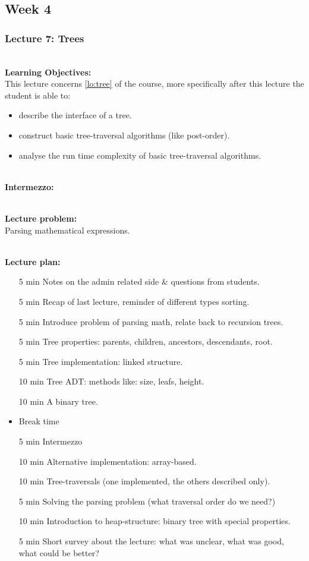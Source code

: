 \subsection{Week 4}
\label{sub:week_4}

\subsubsection{Lecture 7: Trees}
\label{sub:lecture_7}

\hfill\\
\textbf{Learning Objectives:}\\

This lecture concerns \cref{lo:tree} of the course, more specifically after this lecture the student is able
to:
\begin{itemize}
	\item describe the interface of a tree.
	\item construct basic tree-traversal algorithms (like post-order).
	\item analyse the run time complexity of basic tree-traversal algorithms.
\end{itemize}

\hfill\\
\textbf{Intermezzo:}\\

\hfill\\
\textbf{Lecture problem:}\\
Parsing mathematical expressions.

\hfill\\
\textbf{Lecture plan:}\\
\begin{itemize}
	\item[5 min] Notes on the admin related side \& questions from students.
	\item[5 min] Recap of last lecture, reminder of different types sorting.
	\item[5 min] Introduce problem of parsing math, relate back to recursion trees.
	\item[5 min] Tree properties: parents, children, ancestors, descendants, root.
	\item[5 min] Tree implementation: linked structure.
	\item[10 min] Tree ADT: methods like: size, leafs, height.
	\item[10 min] A binary tree.
	\item Break time
	\item[5 min] Intermezzo
	\item[10 min] Alternative implementation: array-based.
	\item[10 min] Tree-traversals (one implemented, the others described only).
	\item[5 min] Solving the parsing problem (what traversal order do we need?)
	\item[10 min] Introduction to heap-structure: binary tree with special properties.
	\item[5 min] Short survey about the lecture: what was unclear, what was good, what could be better?
\end{itemize}

